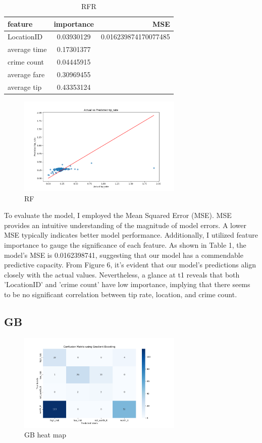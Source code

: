 \documentclass[11pt]{article}
\begin{document}
\begin{table}[h]
\centering
\caption{RFR}
\label{table:example}
\begin{tabular}{|l|c|r|}
\hline
feature & importance & MSE \\
\hline
LocationID & 0.03930129 & 0.016239874170077485 \\
average time & 0.17301377 &  \\
crime count & 0.04445915 &  \\
average fare & 0.30969455 &  \\
average tip & 0.43353124 &  \\
\hline
\end{tabular}
\end{table}

\begin{figure}[h]
    \includegraphics[width=0.7\textwidth]{plots/RF result.png}
    \centering
    \caption{RF} 
\end{figure}
To evaluate the model, I employed the Mean Squared Error (MSE). MSE provides an intuitive understanding of the magnitude of model errors. A lower MSE typically indicates better model performance. Additionally, I utilized feature importance to gauge the significance of each feature. As shown in Table 1, the model's MSE is 0.0162398741, suggesting that our model has a commendable predictive capacity. From Figure 6, it's evident that our model's predictions align closely with the actual values. Nevertheless, a glance at t1 reveals that both 'LocationID' and 'crime count' have low importance, implying that there seems to be no significant correlation between tip rate, location, and crime count.


\subsection{GB}

\begin{figure}[h]
    \includegraphics[width=0.7\textwidth]{plots/GB heat map.png}
    \centering
    \caption{GB heat map} 
\end{figure}
\end{document}
